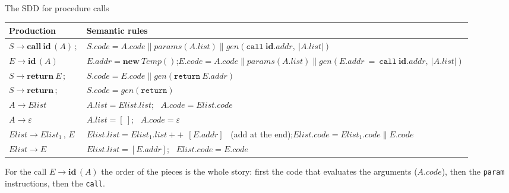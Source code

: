 \documentclass[11pt,a4paper]{article}
\newcommand{\cc}{\mathbin{\|}}
\newcommand{\at}[2]{\ensuremath{#1.\mathit{#2}}}
\newcommand{\tok}[1]{\ensuremath{\mathtt{#1}}}
\begin{document}
\begin{defbox}{The SDD for procedure calls}
\begin{center}
\small
\begin{tabular}{@{}l p{9.8cm}@{}}
\toprule
\textbf{Production} & \textbf{Semantic rules} \\ \midrule
$S \to \mathbf{call}\ \mathbf{id}\,(A)\,;$ & $\at{S}{code}=\at{A}{code}\cc\mathit{params}(\at{A}{list})\cc\mathit{gen}(\tok{call}\ \at{\mathbf{id}}{addr},\ |\at{A}{list}|)$ \\[3pt]
$E \to \mathbf{id}\,(A)$ & $\at{E}{addr}=\mathbf{new}\ \mathit{Temp}()$;\newline $\at{E}{code}=\at{A}{code}\cc\mathit{params}(\at{A}{list})\cc\mathit{gen}(\at{E}{addr}\ \tok{=}\ \tok{call}\ \at{\mathbf{id}}{addr},\ |\at{A}{list}|)$ \\[3pt]
$S \to \mathbf{return}\ E\,;$ & $\at{S}{code}=\at{E}{code}\cc\mathit{gen}(\tok{return}\ \at{E}{addr})$ \\
$S \to \mathbf{return}\,;$ & $\at{S}{code}=\mathit{gen}(\tok{return})$ \\[3pt]
$A \to \mathit{Elist}$ & $\at{A}{list}=\at{Elist}{list}$; \ $\at{A}{code}=\at{Elist}{code}$ \\
$A \to \varepsilon$ & $\at{A}{list}=[\ ]$; \ $\at{A}{code}=\varepsilon$ \\[3pt]
$\mathit{Elist} \to \mathit{Elist}_1\,,\,E$ & $\at{Elist}{list}=\at{Elist_1}{list}\ \mathbin{+\!\!+}\ [\at{E}{addr}]$ \ (add at the end);\newline $\at{Elist}{code}=\at{Elist_1}{code}\cc\at{E}{code}$ \\
$\mathit{Elist} \to E$ & $\at{Elist}{list}=[\at{E}{addr}]$; \ $\at{Elist}{code}=\at{E}{code}$ \\ \bottomrule
\end{tabular}
\end{center}
\end{defbox}
For the call $E\to\mathbf{id}\,(A)$ the order of the pieces is the whole story: first the code that evaluates the arguments (\at{A}{code}), then the \texttt{param} instructions, then the \texttt{call}.
\end{document}
